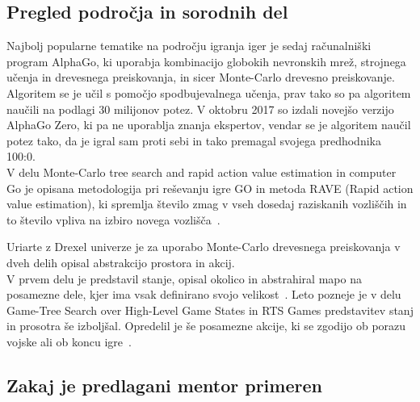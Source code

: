 \documentclass[11pt,a4paper]{article}
\begin{document}

\subsection{Pregled področja in sorodnih del}


Najbolj popularne tematike na področju igranja iger je sedaj računalniški program AlphaGo, ki uporabja kombinacijo globokih nevronskih mrež, strojnega učenja in drevesnega preiskovanja, in sicer Monte-Carlo drevesno preiskovanje.
Algoritem se je učil s pomočjo spodbujevalnega učenja, prav tako so pa algoritem naučili na podlagi 30 milijonov potez.
V oktobru 2017 so izdali novejšo verzijo AlphaGo Zero, ki pa ne uporablja znanja ekspertov, vendar se je algoritem naučil potez tako, da je igral sam proti sebi in tako premagal svojega predhodnika 100:0.\\

V delu Monte-Carlo tree search and rapid action value estimation in computer Go je opisana metodologija pri reševanju igre GO in metoda RAVE (Rapid action value estimation), ki spremlja število zmag v vseh dosedaj raziskanih vozliščih in to število vpliva na izbiro novega vozlišča~\cite{gelly2011monte}.


Uriarte z Drexel univerze je za uporabo Monte-Carlo drevesnega preiskovanja v dveh delih opisal abstrakcijo prostora in akcij.\\
V prvem delu je predstavil stanje, opisal okolico in abstrahiral mapo na posamezne dele, kjer ima vsak definirano svojo velikost~\cite{uriarte2014game}.
Leto pozneje je v delu Game-Tree Search over High-Level Game States in RTS Games predstavitev stanj in prosotra še izboljšal. Opredelil je še posamezne akcije, ki se zgodijo ob porazu vojske ali ob koncu igre~\cite{uriarte2015automatic}.







\subsection{Zakaj je predlagani mentor primeren}
\end{document}
